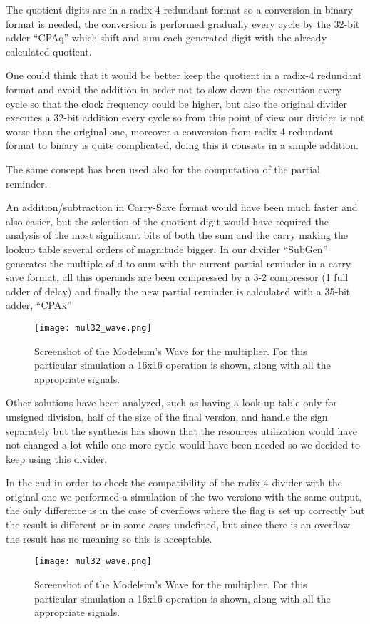 The quotient digits are in a radix-4 redundant format so a conversion in binary format is needed,
the conversion is performed gradually every cycle by the 32-bit adder ``CPAq'' which shift and sum
each generated digit with the already calculated quotient.

One could think that it would be better keep the quotient in a radix-4 redundant format and avoid
the addition in order not to slow down the execution every cycle so that the clock frequency could
be higher, but also the original divider executes a 32-bit addition every cycle so from this point of
view our divider is not worse than the original one, moreover a conversion from radix-4 redundant
format to binary is quite complicated, doing this it consists in a simple addition.

The same concept has been used also for the computation of the partial reminder.

An addition/subtraction in Carry-Save format would have been much faster and also easier, but
the selection of the quotient digit would have required the analysis of the most significant bits of
both the sum and the carry making the lookup table several orders of magnitude bigger.
In our divider ``SubGen'' generates the multiple of d to sum with the current partial reminder in a
carry save format, all this operands are been compressed by a 3-2 compressor (1 full adder of
delay) and finally the new partial reminder is calculated with a 35-bit adder, ``CPAx''

\begin{figure}[H]
\centering
\texttt{[image: mul32\_wave.png]}
\caption{Screenshot of the Modelsim's Wave for the multiplier. For this particular simulation a 16x16 operation is shown, along with all the appropriate signals.}
\label{fig:mul32_wave}
\end{figure}

Other solutions have been analyzed, such as having a look-up table only for unsigned division, half
of the size of the final version, and handle the sign separately but the synthesis has shown that the
resources utilization would have not changed a lot while one more cycle would have been needed
so we decided to keep using this divider.

In the end in order to check the compatibility of the radix-4 divider with the original one we
performed a simulation of the two versions with the same output, the only difference is in the
case of overflows where the flag is set up correctly but the result is different or in some cases
undefined, but since there is an overflow the result has no meaning so this is acceptable.

\begin{figure}[H]
\centering
\texttt{[image: mul32\_wave.png]}
\caption{Screenshot of the Modelsim's Wave for the multiplier. For this particular simulation a 16x16 operation is shown, along with all the appropriate signals.}
\label{fig:mul32_wave}
\end{figure}
